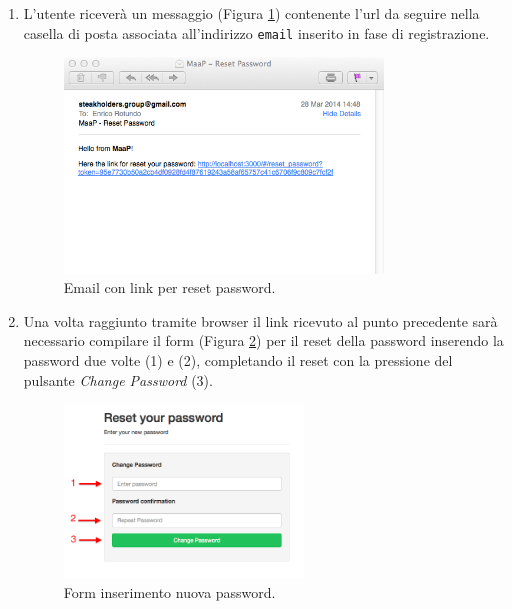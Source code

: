 \begin{enumerate}
			\item L'utente riceverà un messaggio (Figura \ref{fig:mailResetPwd}) contenente l'url da seguire nella casella di posta associata all'indirizzo \texttt{email} inserito in fase di registrazione. 

			\begin{figure}[H]
				\centering \includegraphics[width=0.8\textwidth]{img/mailResetPwd.png}
			\caption{ \label{fig:mailResetPwd} Email con link per reset password.}
			\end{figure}

			\item Una volta raggiunto tramite browser il link ricevuto al punto precedente sarà necessario compilare il form (Figura \ref{fig:resetPwdForm}) per il reset della password inserendo la password due volte (1) e (2), completando il reset con la pressione del pulsante \emph{Change Password} (3).

			\begin{figure}[H]
				\centering \includegraphics[width=0.6\textwidth]{img/resetPwdForm.png}
			\caption{ \label{fig:resetPwdForm} Form inserimento nuova password.}
			\end{figure}

		\end{enumerate}


